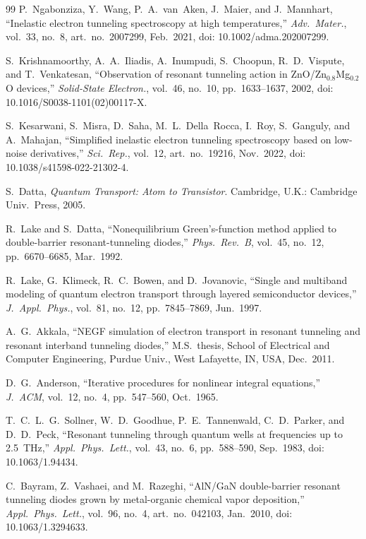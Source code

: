\documentclass[conference]{IEEEtran}
\begin{document}
\begin{thebibliography}{99}
P.~Ngabonziza, Y.~Wang, P.~A.~van~Aken, J.~Maier, and J.~Mannhart,
``Inelastic electron tunneling spectroscopy at high temperatures,''
\textit{Adv.\ Mater.}, vol.~33, no.~8, art.\ no.~2007299, Feb.\ 2021, doi: 10.1002/adma.202007299.

S.~Krishnamoorthy, A.~A.~Iliadis, A.~Inumpudi, S.~Choopun, R.~D.~Vispute, and T.~Venkatesan,
``Observation of resonant tunneling action in ZnO/Zn$_{0.8}$Mg$_{0.2}$O devices,''
\textit{Solid-State Electron.}, vol.~46, no.~10, pp.~1633--1637, 2002, doi: 10.1016/S0038-1101(02)00117-X.

S.~Kesarwani, S.~Misra, D.~Saha, M.~L.~Della~Rocca, I.~Roy, S.~Ganguly, and A.~Mahajan,
``Simplified inelastic electron tunneling spectroscopy based on low-noise derivatives,''
\textit{Sci.\ Rep.}, vol.~12, art.\ no.~19216, Nov.\ 2022, doi: 10.1038/s41598-022-21302-4.

S.~Datta,
\textit{Quantum Transport: Atom to Transistor}.
Cambridge, U.K.: Cambridge Univ.\ Press, 2005.

R.~Lake and S.~Datta,
``Nonequilibrium Green's-function method applied to double-barrier resonant-tunneling diodes,''
\textit{Phys.\ Rev.\ B}, vol.~45, no.~12, pp.~6670--6685, Mar.\ 1992.

R.~Lake, G.~Klimeck, R.~C.~Bowen, and D.~Jovanovic,
``Single and multiband modeling of quantum electron transport through layered semiconductor devices,''
\textit{J.\ Appl.\ Phys.}, vol.~81, no.~12, pp.~7845--7869, Jun.\ 1997.

A.~G.~Akkala,
``NEGF simulation of electron transport in resonant tunneling and resonant interband tunneling diodes,''
M.S.\ thesis, School of Electrical and Computer Engineering, Purdue Univ., West Lafayette, IN, USA, Dec.\ 2011.

D.~G.~Anderson,
``Iterative procedures for nonlinear integral equations,''
\textit{J.\ ACM}, vol.~12, no.~4, pp.~547--560, Oct.\ 1965.

T.~C.~L.~G.~Sollner, W.~D.~Goodhue, P.~E.~Tannenwald, C.~D.~Parker, and D.~D.~Peck,
``Resonant tunneling through quantum wells at frequencies up to 2.5~THz,''
\textit{Appl.\ Phys.\ Lett.}, vol.~43, no.~6, pp.~588--590, Sep.\ 1983, doi: 10.1063/1.94434.

C.~Bayram, Z.~Vashaei, and M.~Razeghi,
``AlN/GaN double-barrier resonant tunneling diodes grown by metal-organic chemical vapor deposition,''
\textit{Appl.\ Phys.\ Lett.}, vol.~96, no.~4, art.\ no.~042103, Jan.\ 2010, doi: 10.1063/1.3294633.


\end{thebibliography}
\end{document}
